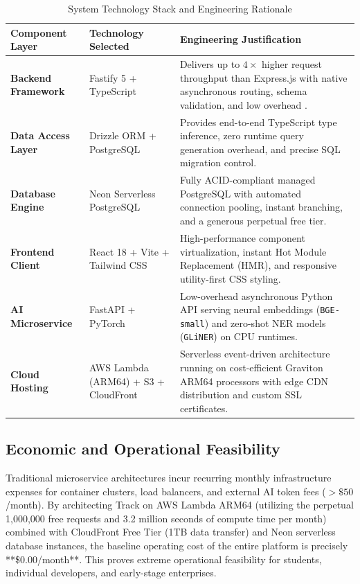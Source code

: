 \begin{table}[htbp]
\centering
\small
\caption{System Technology Stack and Engineering Rationale}
\label{tab:tech_stack}
\begin{tabularx}{\textwidth}{l p{3.2cm} X}
\toprule
\textbf{Component Layer} & \textbf{Technology Selected} & \textbf{Engineering Justification} \\
\midrule
\textbf{Backend Framework} & Fastify 5 + TypeScript & Delivers up to $4\times$ higher request throughput than Express.js with native asynchronous routing, schema validation, and low overhead \cite{fastify2024}. \\
\textbf{Data Access Layer} & Drizzle ORM + PostgreSQL & Provides end-to-end TypeScript type inference, zero runtime query generation overhead, and precise SQL migration control. \\
\textbf{Database Engine} & Neon Serverless PostgreSQL & Fully ACID-compliant managed PostgreSQL with automated connection pooling, instant branching, and a generous perpetual free tier. \\
\textbf{Frontend Client} & React 18 + Vite + Tailwind CSS & High-performance component virtualization, instant Hot Module Replacement (HMR), and responsive utility-first CSS styling. \\
\textbf{AI Microservice} & FastAPI + PyTorch & Low-overhead asynchronous Python API serving neural embeddings (\texttt{BGE-small}) and zero-shot NER models (\texttt{GLiNER}) on CPU runtimes. \\
\textbf{Cloud Hosting} & AWS Lambda (ARM64) + S3 + CloudFront & Serverless event-driven architecture running on cost-efficient Graviton ARM64 processors with edge CDN distribution and custom SSL certificates. \\
\bottomrule
\end{tabularx}
\end{table}

\subsection{Economic and Operational Feasibility}
Traditional microservice architectures incur recurring monthly infrastructure expenses for container clusters, load balancers, and external AI token fees ($>\$50$/month). By architecting Track on AWS Lambda ARM64 (utilizing the perpetual 1,000,000 free requests and 3.2 million seconds of compute time per month) combined with CloudFront Free Tier (1TB data transfer) and Neon serverless database instances, the baseline operating cost of the entire platform is precisely **\$0.00/month**. This proves extreme operational feasibility for students, individual developers, and early-stage enterprises.

